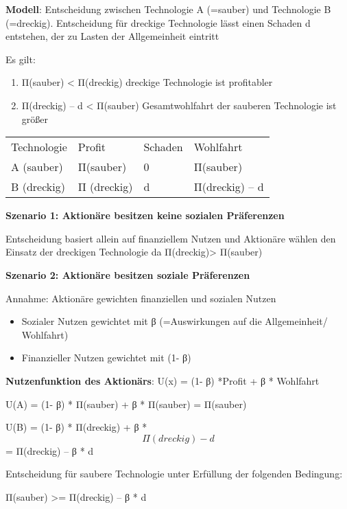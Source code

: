 \documentclass[
]{article}
\providecommand{\tightlist}{%
  \setlength{\itemsep}{0pt}\setlength{\parskip}{0pt}}
\begin{document}
\textbf{Modell}: Entscheidung zwischen Technologie A (=sauber) und
Technologie B (=dreckig). Entscheidung für dreckige Technologie lässt
einen Schaden d entstehen, der zu Lasten der Allgemeinheit eintritt

Es gilt:

\begin{enumerate}
\def\labelenumi{\arabic{enumi}.}
\tightlist
\item
  Π(sauber) \textless{} Π(dreckig) dreckige Technologie ist profitabler
\item
  Π(dreckig) -- d \textless{} Π(sauber) Gesamtwohlfahrt der sauberen
  Technologie ist größer
\end{enumerate}

\begin{longtable}[]{@{}llll@{}}
\toprule
\endhead
Technologie & Profit & Schaden & Wohlfahrt \\
A (sauber) & Π(sauber) & 0 & Π(sauber) \\
B (dreckig) & Π (dreckig) & d & Π(dreckig) -- d \\
\bottomrule
\end{longtable}

\textbf{Szenario 1: Aktionäre besitzen keine sozialen Präferenzen }

Entscheidung basiert allein auf finanziellem Nutzen und Aktionäre wählen
den Einsatz der dreckigen Technologie da Π(dreckig)\textgreater{}
Π(sauber)

\textbf{Szenario 2: Aktionäre besitzen soziale Präferenzen}

Annahme: Aktionäre gewichten finanziellen und sozialen Nutzen

\begin{itemize}
\tightlist
\item
  Sozialer Nutzen gewichtet mit β (=Auswirkungen auf die Allgemeinheit/
  Wohlfahrt)
\item
  Finanzieller Nutzen gewichtet mit (1- β)
\end{itemize}

\textbf{Nutzenfunktion des Aktionärs}: U(x) = (1- β) *Profit + β *
Wohlfahrt

U(A) = (1- β) * Π(sauber) + β * Π(sauber) = Π(sauber)

U(B) = (1- β) * Π(dreckig) + β *\[ Π(dreckig) - d\] = Π(dreckig) -- β *
d

Entscheidung für saubere Technologie unter Erfüllung der folgenden
Bedingung:

Π(sauber) \textgreater= Π(dreckig) -- β * d
\end{document}
